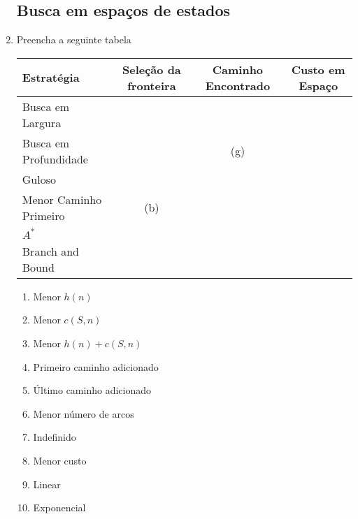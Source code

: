 \documentclass{article}
\begin{document}
\begin{enumerate}

    
    
    

\subsection{Busca em espaços de estados}

\item  Preencha a seguinte tabela

    \begin{center}
        \begin{tabular}{|l|c|c|c|}
        \hline
        Estratégia            & Seleção da fronteira & Caminho Encontrado & Custo em Espaço \\
        \hline
        Busca em Largura      &     &   &   \\
        \hline
        Busca em Profundidade &     & (g)  &   \\
        \hline
        Guloso                &     &   &   \\
        \hline
        Menor Caminho Primeiro& (b) &   &   \\
        \hline
        $A^*$                 &     &   &   \\
        \hline
        Branch and Bound      &     &   &   \\
        \hline
    \end{tabular}
    \end{center}
    
    \begin{enumerate}
        \item Menor $h(n)$
        \item Menor $c(S,n)$
        \item Menor $h(n) + c(S,n)$
        \item Primeiro caminho adicionado 
        \item Último caminho adicionado 
        \item Menor número de arcos
        \item Indefinido
        \item Menor custo
        \item Linear 
        \item Exponencial
   

\end{enumerate}
\end{enumerate}
\end{document}
